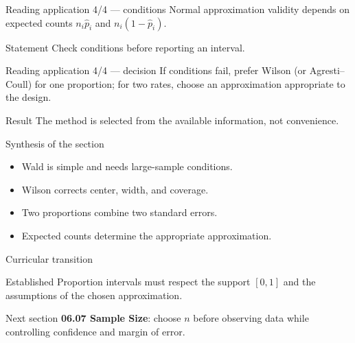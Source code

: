 \documentclass[10pt,aspectratio=169]{beamer}
\begin{document}
\begin{frame}{Reading application 4/4 --- conditions}
  \footnotesize
  Normal approximation validity depends on expected counts
  $n_i\hat p_i$ and $n_i(1-\hat p_i)$.
  \begin{block}{Statement}
    Check conditions before reporting an interval.
  \end{block}
\end{frame}

\begin{frame}{Reading application 4/4 --- decision}
  \footnotesize
  If conditions fail, prefer Wilson (or Agresti--Coull) for one proportion; for
  two rates, choose an approximation appropriate to the design.
  \begin{exampleblock}{Result}
    The method is selected from the available information, not convenience.
  \end{exampleblock}
\end{frame}

\begin{frame}{Synthesis of the section}
  \footnotesize
  \begin{itemize}\itemsep=0.12cm
    \item Wald is simple and needs large-sample conditions.
    \item Wilson corrects center, width, and coverage.
    \item Two proportions combine two standard errors.
    \item Expected counts determine the appropriate approximation.
  \end{itemize}
\end{frame}

\begin{frame}{Curricular transition}
  \footnotesize
  \begin{block}{Established}
    Proportion intervals must respect the support $[0,1]$ and the assumptions of
    the chosen approximation.
  \end{block}
  \begin{alertblock}{Next section}
    \textbf{06.07 Sample Size}: choose $n$ before observing data while controlling
    confidence and margin of error.
  \end{alertblock}
\end{frame}
\end{document}
